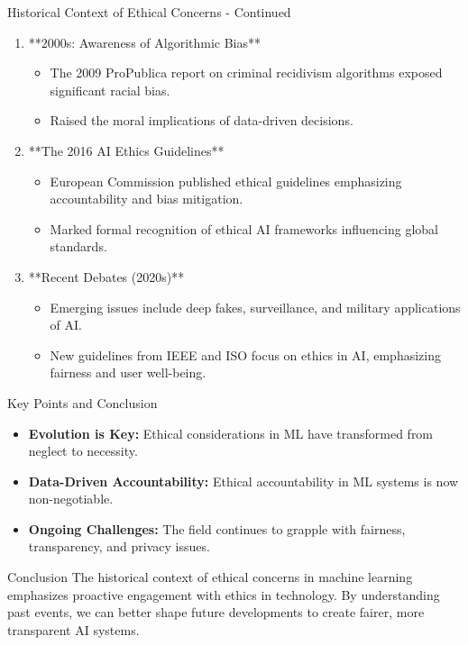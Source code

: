 \documentclass[aspectratio=169]{beamer}
\begin{document}
\begin{frame}[fragile]{Historical Context of Ethical Concerns - Continued}
    \begin{enumerate}[resume]
        \item **2000s: Awareness of Algorithmic Bias**
            \begin{itemize}
                \item The 2009 ProPublica report on criminal recidivism algorithms exposed significant racial bias.
                \item Raised the moral implications of data-driven decisions.
            \end{itemize}
        \item **The 2016 AI Ethics Guidelines**
            \begin{itemize}
                \item European Commission published ethical guidelines emphasizing accountability and bias mitigation.
                \item Marked formal recognition of ethical AI frameworks influencing global standards.
            \end{itemize}
        \item **Recent Debates (2020s)**
            \begin{itemize}
                \item Emerging issues include deep fakes, surveillance, and military applications of AI.
                \item New guidelines from IEEE and ISO focus on ethics in AI, emphasizing fairness and user well-being.
            \end{itemize}
    \end{enumerate}
\end{frame}

\begin{frame}[fragile]{Key Points and Conclusion}
    \begin{itemize}
        \item \textbf{Evolution is Key:} Ethical considerations in ML have transformed from neglect to necessity.
        \item \textbf{Data-Driven Accountability:} Ethical accountability in ML systems is now non-negotiable.
        \item \textbf{Ongoing Challenges:} The field continues to grapple with fairness, transparency, and privacy issues.
    \end{itemize}
    \begin{block}{Conclusion}
        The historical context of ethical concerns in machine learning emphasizes proactive engagement with ethics in technology. By understanding past events, we can better shape future developments to create fairer, more transparent AI systems.
    \end{block}
\end{frame}
\end{document}
